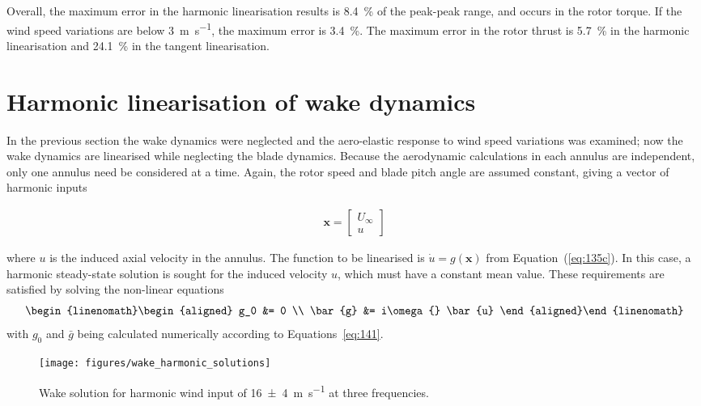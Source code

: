 \documentclass[a4paper,preprint]{elsarticle}
\begin{document}
Overall, the maximum error in the harmonic linearisation results is \SI{8.4}{\%}
of the peak-peak range, and occurs in the rotor torque. If the wind speed
variations are below \SI{3}{\metre\per\second}, the maximum error is
\SI{3.4}{\%}. The maximum error in the rotor thrust is \SI{5.7}{\%} in the
harmonic linearisation and \SI{24.1}{\%} in the tangent linearisation.

\section{Harmonic linearisation of wake dynamics}
\label{sec:lin-wake}

In the previous section the wake dynamics were neglected and the aero-elastic
response to wind speed variations was examined; now the wake dynamics are
linearised while neglecting the blade dynamics. Because the aerodynamic
calculations in each annulus are independent, only one annulus need be
considered at a time. Again, the rotor speed and blade pitch angle are assumed
constant, giving a vector of harmonic inputs
\begin{linenomath}\begin{align}
  \label{eq:155}
  \boldsymbol{x} = \begin{bmatrix}
    U_\infty{} \\ u
  \end{bmatrix}
\end{align}\end{linenomath}
where $u$ is the induced axial velocity in the annulus. The function to be
linearised is $\dot{u} = g(\mathbf{x})$ from Equation~(\ref{eq:135c}). In this
case, a harmonic steady-state solution is sought for the induced velocity $u$,
which must have a constant mean value. These requirements are satisfied by
solving the non-linear equations
\begin{subequations}
  \label{eq:156}
  \begin{linenomath}\begin{align}
    g_0 &= 0 \\
    \bar{g} &= i\omega{} \bar{u}
  \end{align}\end{linenomath}
\end{subequations}
with $g_0$ and $\bar{g}$ being calculated numerically according to
Equations~\eqref{eq:141}.

\begin{figure}
  \centering
  \hspace*{-1cm}\texttt{[image: figures/wake\_harmonic\_solutions]}
  \caption{Wake solution for harmonic wind input of
    \SI[separate-uncertainty = true]{16+-4}{\metre\per\second} at three frequencies.%
  }
\label{fig:wake-examples}
\end{figure}
\end{document}
